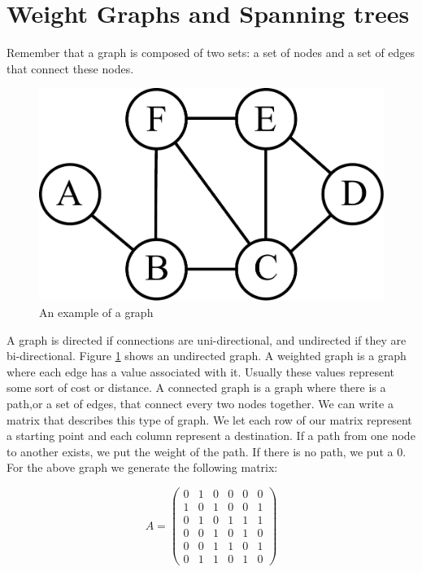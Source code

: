 \label{Ch:Kruskal}


\section*{Weight Graphs and Spanning trees}


Remember that a graph is composed of two sets: a set of nodes and a set of edges that connect these nodes. 

\begin{figure}[H]
\includegraphics[width = .4\textwidth]{graph1.pdf}
\caption{An example of a graph}
\label{mst:graph1}
\end{figure}

A graph is directed if connections are uni-directional, and undirected if they are bi-directional.
Figure \ref{mst:graph1} shows an undirected graph.
A weighted graph is a graph where each edge has a value associated with it.
Usually these values represent some sort of cost or distance.
A connected graph is a graph where there is a path,or a set of edges, that connect every two nodes together.
We can write a matrix that describes this type of graph.
We let each row of our matrix represent a starting point and each column represent a destination.
If a path from one node to another exists, we put the weight of the path.
If there is no path, we put a 0.
For the above graph we generate the following matrix:

\[
A = \begin{pmatrix}
0 & 1 & 0 & 0 & 0 & 0\\
1 & 0 & 1 & 0 & 0 & 1\\
0 & 1 & 0 & 1 & 1 & 1\\
0 & 0 & 1 & 0 & 1 & 0\\
0 & 0 & 1 & 1 & 0 & 1\\
0 & 1 & 1 & 0 & 1 & 0
\end{pmatrix}
\]

